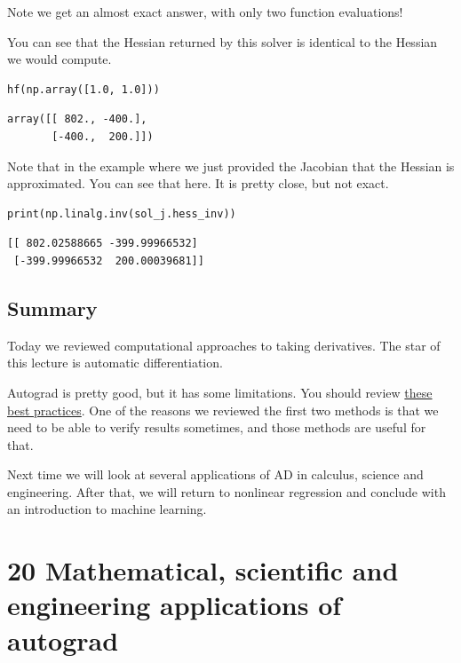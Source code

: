 \documentclass[11pt]{article}
\begin{document}
Note we get an almost exact answer, with only two function evaluations!

You can see that the Hessian returned by this solver is identical to the Hessian we would compute.


\begin{verbatim}
hf(np.array([1.0, 1.0]))
\end{verbatim}

\begin{verbatim}
array([[ 802., -400.],
       [-400.,  200.]])
\end{verbatim}

Note that in the example where we just provided the Jacobian that the Hessian is approximated. You can see that here. It is pretty close, but not exact.

\begin{verbatim}
print(np.linalg.inv(sol_j.hess_inv))
\end{verbatim}

\begin{verbatim}
[[ 802.02588665 -399.99966532]
 [-399.99966532  200.00039681]]

\end{verbatim}

\subsection{Summary}
\label{sec:orgd93eeaa}

Today we reviewed computational approaches to taking derivatives. The star of this lecture is automatic differentiation.

Autograd is pretty good, but it has some limitations. You should review \href{https://github.com/HIPS/autograd/blob/master/docs/tutorial.md\#supported-and-unsupported-parts-of-numpyscipy}{these best practices}. One of the reasons we reviewed the first two methods is that we need to be able to verify results sometimes, and those methods are useful for that.

Next time we will look at several applications of AD in calculus, science and engineering. After that, we will return to nonlinear regression and conclude with an introduction to machine learning.

\section{20 Mathematical, scientific and engineering applications of autograd}
\label{sec:org4702632}
\end{document}
